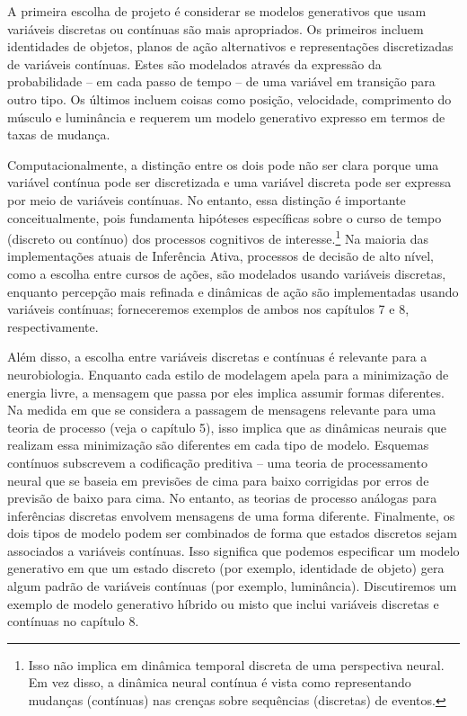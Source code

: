 \documentclass[
  12pt,
]{book}
\begin{document}
A primeira escolha de projeto é considerar se modelos generativos que usam variáveis discretas ou contínuas são mais apropriados. Os primeiros incluem identidades de objetos, planos de ação alternativos e representações discretizadas de variáveis contínuas. Estes são modelados através da expressão da probabilidade -- em cada passo de tempo -- de uma variável em transição para outro tipo. Os últimos incluem coisas como posição, velocidade, comprimento do músculo e luminância e requerem um modelo generativo expresso em termos de taxas de mudança.

Computacionalmente, a distinção entre os dois pode não ser clara porque uma variável contínua pode ser discretizada e uma variável discreta pode ser expressa por meio de variáveis contínuas. No entanto, essa distinção é importante conceitualmente, pois fundamenta hipóteses específicas sobre o curso de tempo (discreto ou contínuo) dos processos cognitivos de interesse.\footnote{Isso não implica em dinâmica temporal discreta de uma perspectiva neural. Em vez disso, a dinâmica neural contínua é vista como representando mudanças (contínuas) nas crenças sobre sequências (discretas) de eventos.} Na maioria das implementações atuais de Inferência Ativa, processos de decisão de alto nível, como a escolha entre cursos de ações, são modelados usando variáveis discretas, enquanto percepção mais refinada e dinâmicas de ação são implementadas usando variáveis contínuas; forneceremos exemplos de ambos nos capítulos 7 e 8, respectivamente.

Além disso, a escolha entre variáveis discretas e contínuas é relevante para a neurobiologia. Enquanto cada estilo de modelagem apela para a minimização de energia livre, a mensagem que passa por eles implica assumir formas diferentes. Na medida em que se considera a passagem de mensagens relevante para uma teoria de processo (veja o capítulo 5), isso implica que as dinâmicas neurais que realizam essa minimização são diferentes em cada tipo de modelo. Esquemas contínuos subscrevem a codificação preditiva -- uma teoria de processamento neural que se baseia em previsões de cima para baixo corrigidas por erros de previsão de baixo para cima. No entanto, as teorias de processo análogas para inferências discretas envolvem mensagens de uma forma diferente. Finalmente, os dois tipos de modelo podem ser combinados de forma que estados discretos sejam associados a variáveis contínuas. Isso significa que podemos especificar um modelo generativo em que um estado discreto (por exemplo, identidade de objeto) gera algum padrão de variáveis contínuas (por exemplo, luminância). Discutiremos um exemplo de modelo generativo híbrido ou misto que inclui variáveis discretas e contínuas no capítulo 8.
\end{document}
